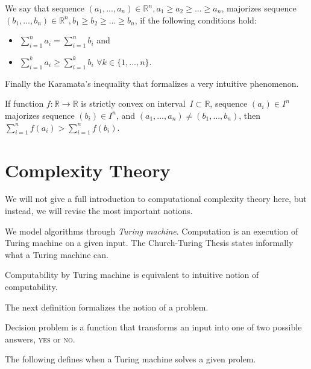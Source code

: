 \begin{defn}[majorization]
We say that sequence $(a_1, ..., a_n) \in \mathbb{R}^n, a_1 \geq a_2 \geq ... \geq a_n$,
majorizes sequence $(b_1, ..., b_n) \in \mathbb{R}^n, b_1 \geq b_2 \geq ... \geq b_n$,
if the following conditions hold:
\begin{itemize}
	\item $\sum_{i=1}^n a_i = \sum_{i=1}^n b_i$ and
	\item $\sum_{i=1}^k a_i \geq \sum_{i=1}^k b_i$ $\forall k \in \{ 1, ..., n\}$.
\end{itemize}
\end{defn}

Finally the Karamata's inequality that formalizes a very intuitive phenomenon.

\begin{thm} \label{thm:Kar}
If function $f:\mathbb{R}\rightarrow\mathbb{R}$ is strictly convex on interval~$I \subset \mathbb{R}$,
sequence $(a_i) \in I^n$ majorizes sequence $(b_i) \in I^n$,
and $(a_1, ..., a_n) \neq (b_1, ..., b_n)$, then
$\sum_{i=1}^n f(a_i) > \sum_{i=1}^n f(b_i)$.
\end{thm}


\section{Complexity Theory}

We will not give a full introduction to computational complexity theory here,
but instead, we will revise the most important notions.

We model algorithms through \textit{Turing machine}.
Computation is an execution of Turing machine on a given input.
The Church-Turing Thesis states informally what a Turing machine can.

\begin{cnj}
Computability by Turing machine is equivalent to intuitive notion of computability.
\end{cnj}

The next definition formalizes the notion of a problem.

\begin{defn}
Decision problem is a function that transforms an input into one of two possible answers,
\textsc{yes} or \textsc{no}.
\end{defn}

The following defines when a Turing machine solves a given prolem.

